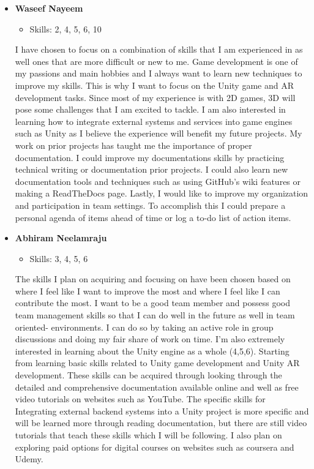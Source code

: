 \documentclass[12pt]{article}
\begin{document}
\begin{enumerate}
\begin{itemize}
      \item \textbf{Waseef Nayeem}
        \begin{itemize}
            \item Skills: 2, 4, 5, 6, 10
        \end{itemize}
        I have chosen to focus on a combination of skills that I am experienced in as well ones that are more difficult or new to me. Game development is one of my passions and main hobbies and I always want to learn new techniques to improve my skills. This is why I want to focus on the Unity game and AR development tasks. Since most of my experience is with 2D games, 3D will pose some challenges that I am excited to tackle. I am also interested in learning how to integrate external systems and services into game engines such as Unity as I believe the experience will benefit my future projects. My work on prior projects has taught me the importance of proper documentation. I could improve my documentations skills by practicing technical writing or documentation prior projects. I could also learn new documentation tools and techniques such as using GitHub's wiki features or making a ReadTheDocs page. Lastly, I would like to improve my organization and participation in team settings. To accomplish this I could prepare a personal agenda of items ahead of time or log a to-do list of action items.
        
      \item \textbf{Abhiram Neelamraju}
        \begin{itemize}
            \item Skills: 3, 4, 5, 6
        \end{itemize}
        The skills I plan on acquiring and focusing on have been chosen based on where I feel like I want to improve the most and where I feel like I can contribute the most. I want to be a good team member and possess good team management skills so that I can do well in the future as well in team oriented- environments. I can do so by taking an active role in group discussions and doing my fair share of work on time. I’m also extremely interested in learning about the Unity engine as a whole (4,5,6). Starting from learning basic skills related to Unity game development and Unity AR development. These skills can be acquired through looking through the detailed and comprehensive documentation available online and well as free video tutorials on websites such as YouTube. The specific skills for Integrating external backend systems into a Unity project is more specific and will be learned more through reading documentation, but there are still video tutorials that teach these skills which I will be following. I also plan on exploring paid options for digital courses on websites such as coursera and Udemy.

\end{itemize}
\end{enumerate}
\end{document}
